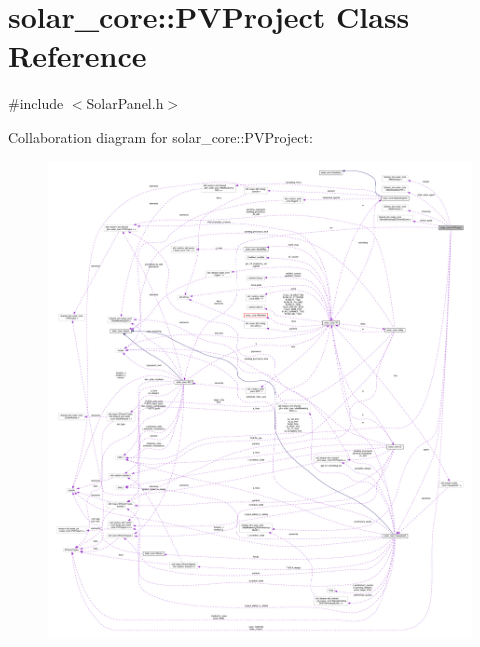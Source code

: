 \hypertarget{classsolar__core_1_1_p_v_project}{}\section{solar\+\_\+core\+:\+:P\+V\+Project Class Reference}
\label{classsolar__core_1_1_p_v_project}


{\ttfamily \#include $<$Solar\+Panel.\+h$>$}



Collaboration diagram for solar\+\_\+core\+:\+:P\+V\+Project\+:
\nopagebreak
\begin{figure}[H]
\begin{center}
\leavevmode
\includegraphics[width=350pt]{classsolar__core_1_1_p_v_project__coll__graph}
\end{center}
\end{figure}
